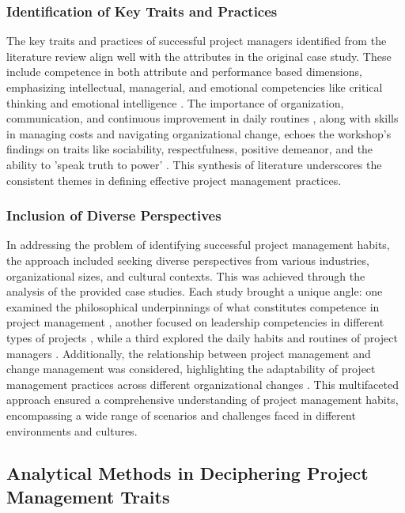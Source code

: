 \documentclass{article}
\begin{document}
\subsubsection{Identification of Key Traits and Practices} 

The key traits and practices of successful project managers identified from the literature review align well with the attributes in the original case study. These include competence in both attribute and performance based dimensions, emphasizing intellectual, managerial, and emotional competencies like critical thinking and emotional intelligence \cite{muller2010leadership}. The importance of organization, communication, and continuous improvement in daily routines \cite{sigurdhssonpatterns}, along with skills in managing costs and navigating organizational change, echoes the workshop's findings on traits like sociability, respectfulness, positive demeanor, and the ability to 'speak truth to power' \cite{bredillet2015good}. This synthesis of literature underscores the consistent themes in defining effective project management practices.

\subsubsection{Inclusion of Diverse Perspectives}

In addressing the problem of identifying successful project management habits, the approach included seeking diverse perspectives from various industries, organizational sizes, and cultural contexts. This was achieved through the analysis of the provided case studies. Each study brought a unique angle: one examined the philosophical underpinnings of what constitutes competence in project management \cite{bredillet2015good}, another focused on leadership competencies in different types of projects \cite{muller2010leadership}, while a third explored the daily habits and routines of project managers \cite{sigurdhssonpatterns}. Additionally, the relationship between project management and change management was considered, highlighting the adaptability of project management practices across different organizational changes \cite{pollack2016project}. This multifaceted approach ensured a comprehensive understanding of project management habits, encompassing a wide range of scenarios and challenges faced in different environments and cultures.

\subsection{Analytical Methods in Deciphering Project Management Traits}
\end{document}
